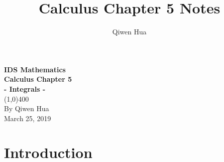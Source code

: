 \documentclass[11pt]{article}
\title{Calculus Chapter 5 Notes}
\author{Qiwen Hua}
\begin{document}
\begin{titlepage}
    \begin{center}
        \vspace*{1cm}
        \Large{\textbf{IDS Mathematics}}\\
        \vfill
        \huge{\textbf{Calculus Chapter 5}}\\[3mm]
        \Large{\textbf{- Integrals -}}\\[1mm]
        \line(1,0){400}\\
        \vfill
        By Qiwen Hua\\
        March 25, 2019
    \end{center}
\end{titlepage}

\setcounter{page}{0}
\tableofcontents
\clearpage

\setcounter{page}{1}
\section{Introduction}
\end{document}

